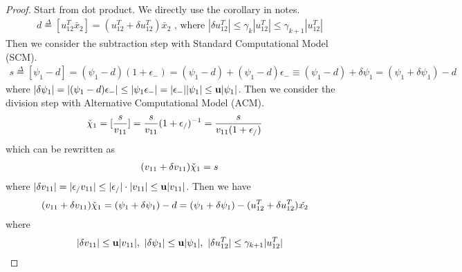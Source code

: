 \documentclass[11pt,a4paper]{article}
\begin{document}
\subsection{}
\begin{proof}
Start from dot product. We directly use the corollary in notes. 
\begin{align}
    d \overset{\Delta}{=} [u_{12}^T \check{x_2}] = (u_{12}^T + \delta u_{12}^T) \check{x_2}
    \text{ , where } |\delta u_{12}^T| \leq \gamma_k |u_{12}^T| \leq \gamma_{k+1} |u_{12}^T|
\end{align}
Then we consider the subtraction step with Standard Computational Model (SCM).
\begin{align}
    s \overset{\Delta}{=} [\psi_1 - d] 
    = (\psi_1 - d) (1+\epsilon_-)
    = (\psi_1 - d) + (\psi_1 - d) \epsilon_-
    \equiv (\psi_1 - d) + \delta \psi_1 
    = (\psi_1 + \delta \psi_1 ) - d
\end{align}
where 
$|\delta \psi_1| = |(\psi_1 - d) \epsilon_-| \leq | \psi_1  \epsilon_-|
    =  |\epsilon_-| | \psi_1 | \leq \mathbf{u} |\psi_1| $.
Then we consider the division step with Alternative Computational Model (ACM).
\begin{align}
    &\check{\chi}_1 = [\frac{s}{v_{11}}]  = \frac{s}{v_{11}} (1+\epsilon_/)^{-1} 
    =  \frac{s}{v_{11}(1+\epsilon_/)}
\end{align}
which can be rewritten as  
\begin{align}
    (v_{11}+\delta v_{11}) \check{\chi}_1  = s
\end{align}
where $ |\delta v_{11}| = |\epsilon_/ v_{11}| \leq |\epsilon_/|\cdot |v_{11}| \leq \mathbf{u} |v_{11}| $.
Then we have 
\begin{align}
    (v_{11}+\delta v_{11}) \check{\chi}_1  
    &= (\psi_1 + \delta \psi_1 ) - d  
    = (\psi_1 + \delta \psi_1 ) - (u_{12}^T + \delta u_{12}^T) \check{x_2}
\end{align}
where 
\begin{align}
    |\delta v_{11}| \leq \bu  |v_{11}|,\ 
    |\delta \psi_1| \leq \bu |\psi_1|,\ 
    |\delta u_{12}^T| \leq \gamma_{k+1}|u_{12}^T|
\end{align}
\end{proof}

\newpage
\end{document}
